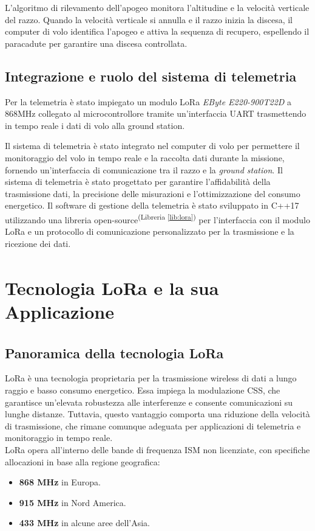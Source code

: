 \documentclass[12pt,a4paper,twoside]{book}
\newcommand{\libref}[1]{\textsuperscript{(Libreria \ref{#1})}}
\begin{document}
L'algoritmo di rilevamento dell'apogeo monitora l'altitudine e la velocità verticale
del razzo.
Quando la velocità verticale si annulla e il razzo inizia la discesa,  il
computer di volo identifica l'apogeo e attiva la sequenza di recupero,
espellendo il paracadute per garantire una discesa controllata.

\section{Integrazione e ruolo del sistema di telemetria}
Per la telemetria è stato impiegato un modulo \ac{LoRa} \emph{EByte E220-900T22D}
a 868MHz collegato al microcontrollore tramite un'interfaccia \ac{UART}
trasmettendo in tempo reale i dati di volo alla ground station.

Il sistema di telemetria è stato integrato nel computer di volo per permettere il
monitoraggio del volo in tempo reale e la raccolta dati durante la missione,
fornendo un'interfaccia di comunicazione tra il razzo e la \emph{ground station}.
Il sistema di telemetria è stato progettato per garantire l'affidabilità della
trasmissione dati, la precisione delle misurazioni e l'ottimizzazione del consumo
energetico.%
Il software di gestione della telemetria è stato sviluppato in C++17 utilizzando
una libreria open-source\libref{lib:lora} per l'interfaccia con il modulo \ac{LoRa} 
e un protocollo di comunicazione personalizzato per la trasmissione e la 
ricezione dei dati.

\chapter{Tecnologia \texorpdfstring{LoRa\textsuperscript{\textcopyright}}{} e la sua Applicazione} \label{chap:lora}

\section{Panoramica della tecnologia \texorpdfstring{LoRa\textsuperscript{\textcopyright}}{}}
\ac{LoRa} è una tecnologia proprietaria per la trasmissione wireless di dati a
lungo raggio e basso consumo energetico. Essa impiega la modulazione \ac{CSS},
che garantisce un'elevata robustezza alle interferenze e consente comunicazioni
su lunghe distanze.
Tuttavia, questo vantaggio comporta una riduzione della velocità di trasmissione,
che rimane comunque adeguata per applicazioni di telemetria e monitoraggio
in tempo reale. \\
\ac{LoRa} opera all'interno delle bande di frequenza \ac{ISM} non licenziate, con specifiche allocazioni in base alla regione geografica:
\begin{itemize}
    \item \textbf{868 MHz} in Europa.
    \item \textbf{915 MHz} in Nord America.
    \item \textbf{433 MHz} in alcune aree dell’Asia.
\end{itemize}
\end{document}
